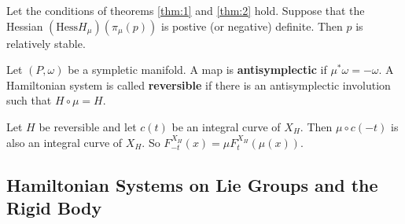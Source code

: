 \begin{thm}
Let the conditions of theorems \ref{thm:1} and \ref{thm:2} hold. Suppose that the Hessian $(\mathrm{Hess}H_{\mu})(\pi_{\mu}(p))$ is postive (or negative) definite. Then $p$ is relatively stable.
\end{thm}

\begin{defn}
Let $(P,\omega)$ be a sympletic manifold. A map is \textbf{antisymplectic} if $\mu^* \omega = - \omega$. A Hamiltonian system is called \textbf{reversible} if there is an antisymplectic involution such that $H \circ \mu = H$.
\end{defn}

\begin{prop}
Let $H$ be reversible and let $c(t)$ be an integral curve of $X_H$. Then $\mu \circ c(-t)$ is also an integral curve of $X_H$. So $F^{X_H}_{-t}(x) = \mu F^{X_H}_t(\mu(x)) $.
\end{prop}

\subsection{Hamiltonian Systems on Lie Groups and the Rigid Body}

